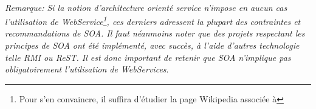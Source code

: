{  \paragraph{} \paragraph{} \textit{Remarque: Si la notion d'architecture orienté service n'impose
  en aucun cas l'utilisation de WebService\footnote{Pour s'en convaincre, il suffira d'étudier la
  page Wikipedia associée à
  }, ces
  derniers adressent la plupart des contraintes et recommandations de SOA. Il faut néanmoins noter
  que des projets respectant les principes de SOA ont  été implémenté, avec succès, à l'aide
  d'autres technologie telle RMI ou ReST. Il est donc important de retenir que SOA n'implique pas
  obligatoirement l'utilisation de \textit{WebServices}}.
}



